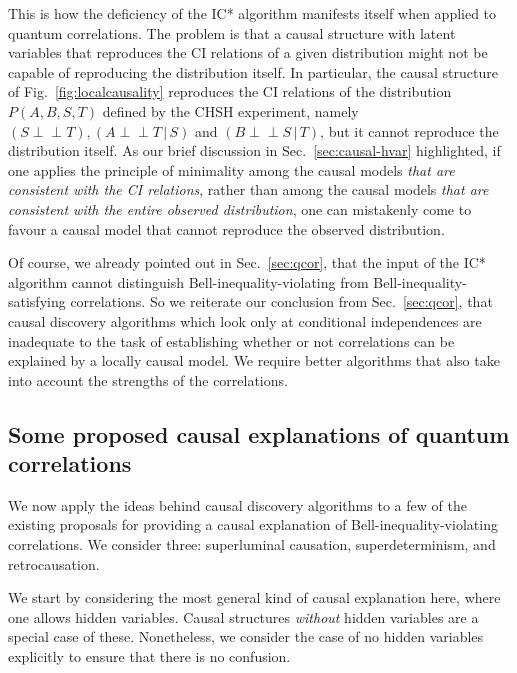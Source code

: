 \documentclass[12pt,onecolumn,nofootinbib]{revtex4-2}
\def\indep{\perp\!\!\!\!\perp}
\begin{document}
This is how the deficiency of the IC* algorithm manifests itself when applied to quantum correlations.    The problem is that a causal structure with latent variables that reproduces the CI relations of a given distribution might not be capable of reproducing the distribution itself.  In particular, the causal structure of Fig.~\ref{fig:localcausality} reproduces the CI relations of the distribution $P(A,B,S,T)$ defined by the CHSH experiment, namely $\left( S\indep T\right) ,\left( A\indep T\,|\,S\right)$ and $\left( B\indep S\,|\,T\right)$, but it cannot reproduce the distribution itself.  
As our brief discussion in Sec.~\ref{sec:causal-hvar} highlighted, if one applies the principle of minimality among the causal models {\em that are consistent with the CI relations}, rather than among the causal models {\em that are consistent with the entire observed distribution}, one can mistakenly come to favour a causal model that cannot reproduce the observed distribution.


Of course, we already pointed out in Sec.~\ref{sec:qcor}, that the input of the IC*
algorithm cannot distinguish Bell-inequality-violating from
Bell-inequality-satisfying correlations.  
So we reiterate our conclusion from Sec.~\ref{sec:qcor}, that causal discovery
algorithms which look only at conditional independences are inadequate to the task of
establishing whether or not correlations can be explained by a locally
causal model. We require better algorithms that also take into account the strengths of the correlations.



\subsection{Some proposed causal explanations of quantum correlations}

We now apply the ideas behind causal discovery algorithms to a few of the existing proposals for providing a causal explanation of Bell-inequality-violating correlations.  We consider three: superluminal causation, superdeterminism, and retrocausation.

We start by considering the most general kind of causal explanation here, where one allows hidden variables.  Causal structures \emph{without} hidden variables are a special case of these. Nonetheless, we consider the case of no hidden variables explicitly to ensure that there is no confusion. 
\end{document}
